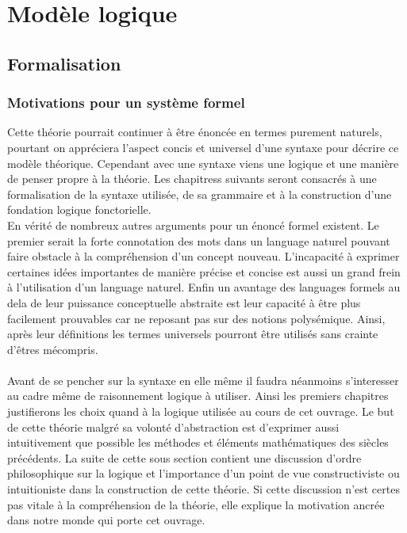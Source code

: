 \documentclass[10pt,b5paper, french]{book}
\begin{document}
\section{Modèle logique}
\subsection{Formalisation}
\subsubsection{Motivations pour un système formel}

Cette théorie pourrait continuer à être énoncée en termes purement naturels, pourtant on appréciera l'aspect concis et universel d'une syntaxe pour décrire ce modèle théorique. Cependant avec une syntaxe viens une logique et une manière de penser propre à la théorie. Les chapitress suivants seront consacrés à une formalisation de la syntaxe utilisée, de sa grammaire et à la construction d'une fondation logique fonctorielle. 
\\
En vérité de nombreux autres arguments pour un énoncé formel existent. Le premier serait la forte connotation des mots dans un language naturel pouvant faire obstacle à la compréhension d'un concept nouveau. L'incapacité à exprimer certaines idées importantes de manière précise et concise est aussi un grand frein à l'utilisation d'un language naturel. Enfin un avantage des languages formels au dela de leur puissance conceptuelle abstraite est leur capacité à être plus facilement prouvables car ne reposant pas sur des notions polysémique. Ainsi, après leur définitions les termes universels pourront être utilisés sans crainte d'êtres mécompris.
\\\\
Avant de se pencher sur la syntaxe en elle même il faudra néanmoins s'interesser au cadre même de raisonnement logique à utiliser. Ainsi les premiers chapitres justifierons les choix quand à la logique utilisée au cours de cet ouvrage. Le but de cette théorie malgré sa volonté d'abstraction est d'exprimer aussi intuitivement que possible les méthodes et éléments mathématiques des siècles précédents. La suite de cette sous section contient une discussion d'ordre philosophique sur la logique et l'importance d'un point de vue constructiviste ou intuitioniste dans la construction de cette théorie. Si cette discussion n'est certes pas vitale à la compréhension de la théorie, elle explique la motivation ancrée dans notre monde qui porte cet ouvrage.
\newpage
\end{document}
